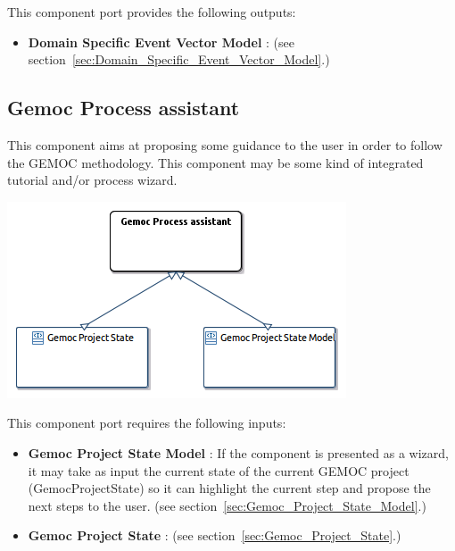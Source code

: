 \documentclass{gemoc} %
\begin{document}
This component port provides the following outputs:
\begin{itemize}
  \item \textbf{Domain Specific Event Vector Model} :
(see section~\ref{sec:Domain_Specific_Event_Vector_Model}.)
\end{itemize}




\subsection{Gemoc Process assistant}
\label{sec:Gemoc_Process_assistant}

This component aims at proposing some guidance to the user in order to follow the GEMOC methodology. This component may be some kind of integrated tutorial and/or process wizard.
\begin{center}
\includegraphics*[trim=0.0cm 0.0cm 0cm 0.0cm, clip=true]{../images/generated/Generated_Gemoc_Process_assistant.png}
\end{center}

This component port requires the following inputs:
\begin{itemize}
  \item \textbf{Gemoc Project State Model} :
If the component is presented as a wizard, it may take as input the current state of the current GEMOC project (GemocProjectState) so it can highlight the current step and propose the next steps to the user.
(see section~\ref{sec:Gemoc_Project_State_Model}.)
  \item \textbf{Gemoc Project State} :
(see section~\ref{sec:Gemoc_Project_State}.)
\end{itemize}
\end{document}
